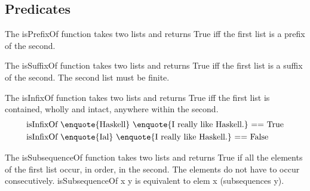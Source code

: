 \subsection{Predicates}
The isPrefixOf function takes two lists and returns True iff the first list is a prefix of the second.

The isSuffixOf function takes two lists and returns True iff the first list is a suffix of the second. The second list must be finite.

The isInfixOf function takes two lists and returns True iff the first list is contained, wholly and intact, anywhere within the second.
\begin{align*}
	&\text{isInfixOf \enquote{Haskell} \enquote{I really like Haskell.} == True}\\
	&\text{isInfixOf \enquote{Ial} \enquote{I really like Haskell.} == False}
\end{align*}

The isSubsequenceOf function takes two lists and returns True if all the elements of the first list occur, in order, in the second. The elements do not have to occur consecutively.
isSubsequenceOf x y is equivalent to elem x (subsequences y).